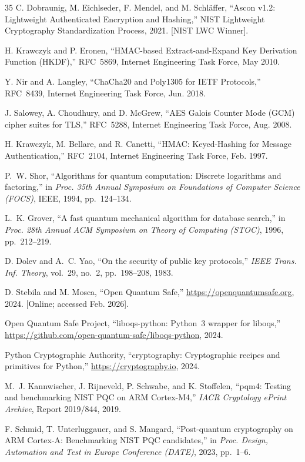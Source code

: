 \documentclass[conference]{IEEEtran}
\begin{document}
\begin{thebibliography}{35}
C. Dobraunig, M. Eichlseder, F. Mendel, and M. Schl{\"a}ffer, ``Ascon v1.2: Lightweight Authenticated Encryption and Hashing,'' NIST Lightweight Cryptography Standardization Process, 2021. [NIST LWC Winner].

H. Krawczyk and P. Eronen, ``HMAC-based Extract-and-Expand Key Derivation Function (HKDF),'' RFC~5869, Internet Engineering Task Force, May 2010.

Y. Nir and A. Langley, ``ChaCha20 and Poly1305 for IETF Protocols,'' RFC~8439, Internet Engineering Task Force, Jun. 2018.

J. Salowey, A. Choudhury, and D. McGrew, ``AES Galois Counter Mode (GCM) cipher suites for TLS,'' RFC~5288, Internet Engineering Task Force, Aug. 2008.

H. Krawczyk, M. Bellare, and R. Canetti, ``HMAC: Keyed-Hashing for Message Authentication,'' RFC~2104, Internet Engineering Task Force, Feb. 1997.

P.~W. Shor, ``Algorithms for quantum computation: Discrete logarithms and factoring,'' in \emph{Proc. 35th Annual Symposium on Foundations of Computer Science (FOCS)}, IEEE, 1994, pp.~124--134.

L.~K. Grover, ``A fast quantum mechanical algorithm for database search,'' in \emph{Proc. 28th Annual ACM Symposium on Theory of Computing (STOC)}, 1996, pp.~212--219.

D. Dolev and A.~C. Yao, ``On the security of public key protocols,'' \emph{IEEE Trans. Inf. Theory}, vol.~29, no.~2, pp.~198--208, 1983.

D. Stebila and M. Mosca, ``Open Quantum Safe,'' \url{https://openquantumsafe.org}, 2024. [Online; accessed Feb. 2026].

Open Quantum Safe Project, ``liboqs-python: Python~3 wrapper for liboqs,'' \url{https://github.com/open-quantum-safe/liboqs-python}, 2024.

Python Cryptographic Authority, ``cryptography: Cryptographic recipes and primitives for Python,'' \url{https://cryptography.io}, 2024.

M.~J. Kannwischer, J. Rijneveld, P. Schwabe, and K. Stoffelen, ``pqm4: Testing and benchmarking NIST PQC on ARM Cortex-M4,'' \emph{IACR Cryptology ePrint Archive}, Report 2019/844, 2019.

F. Schmid, T. Unterluggauer, and S. Mangard, ``Post-quantum cryptography on ARM Cortex-A: Benchmarking NIST PQC candidates,'' in \emph{Proc. Design, Automation and Test in Europe Conference (DATE)}, 2023, pp.~1--6.


\end{thebibliography}
\end{document}
